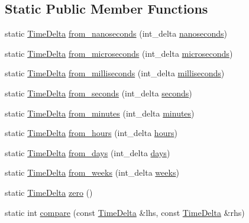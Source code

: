 \subsection*{\-Static \-Public \-Member \-Functions}
\begin{DoxyCompactItemize}
\item 
static \hyperlink{structTimeDelta}{\-Time\-Delta} \hyperlink{structTimeDelta_abc1b517c2156b2d9627fd07d42aecb2f}{from\-\_\-nanoseconds} (int\-\_\-delta \hyperlink{structTimeDelta_a27608357ea9addd1d0da20918f91d500}{nanoseconds})
\item 
static \hyperlink{structTimeDelta}{\-Time\-Delta} \hyperlink{structTimeDelta_a32f3fa21ba37d81507383d001f3b704b}{from\-\_\-microseconds} (int\-\_\-delta \hyperlink{structTimeDelta_aa23b22a3b2a0f3f559e9dc343588b546}{microseconds})
\item 
static \hyperlink{structTimeDelta}{\-Time\-Delta} \hyperlink{structTimeDelta_a01e0919f444379030aa37559fa13542c}{from\-\_\-milliseconds} (int\-\_\-delta \hyperlink{structTimeDelta_a185b2278844ed43b2f5e1e8d16b11cb2}{milliseconds})
\item 
static \hyperlink{structTimeDelta}{\-Time\-Delta} \hyperlink{structTimeDelta_aad4311d8580ade36d8c567576630c967}{from\-\_\-seconds} (int\-\_\-delta \hyperlink{structTimeDelta_aa1fe6d8a690ab04b561400c09db673ef}{seconds})
\item 
static \hyperlink{structTimeDelta}{\-Time\-Delta} \hyperlink{structTimeDelta_a244bc3b143bfa760aa2b0cf350cf768c}{from\-\_\-minutes} (int\-\_\-delta \hyperlink{structTimeDelta_a2856a4e761fc83822cc6987655035e76}{minutes})
\item 
static \hyperlink{structTimeDelta}{\-Time\-Delta} \hyperlink{structTimeDelta_a912f6ceafac4b9252a1a5d76033754ea}{from\-\_\-hours} (int\-\_\-delta \hyperlink{structTimeDelta_a5135596cbf7f7ef40001e25c5aa880b3}{hours})
\item 
static \hyperlink{structTimeDelta}{\-Time\-Delta} \hyperlink{structTimeDelta_a9bb1a85b6f27ad8488ae06e238d5808e}{from\-\_\-days} (int\-\_\-delta \hyperlink{structTimeDelta_abad8a94a6c022af1a1871e452eca47ea}{days})
\item 
static \hyperlink{structTimeDelta}{\-Time\-Delta} \hyperlink{structTimeDelta_ae0f0a41d899e62b9d17bc4542c443ec6}{from\-\_\-weeks} (int\-\_\-delta \hyperlink{structTimeDelta_a4e583a79abea664691df4680f4fd467d}{weeks})
\item 
static \hyperlink{structTimeDelta}{\-Time\-Delta} \hyperlink{structTimeDelta_a2dec837a107c5e46e14b9c69557209fa}{zero} ()
\item 
static int \hyperlink{structTimeDelta_a1bee789870de5a374ee472ffa4bff172}{compare} (const \hyperlink{structTimeDelta}{\-Time\-Delta} \&lhs, const \hyperlink{structTimeDelta}{\-Time\-Delta} \&rhs)
\end{DoxyCompactItemize}
